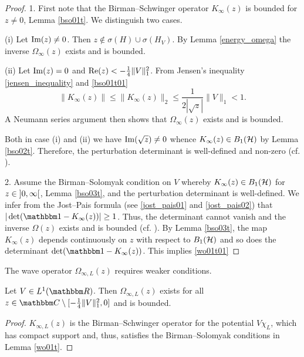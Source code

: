 \begin{proof}
1.
First note that the Birman--Schwinger operator $K_\infty(z)$ is bounded for $z\neq 0$, Lemma \ref{bso01t}.
We distinguish two cases.

(i)
Let $\operatorname{Im}(z)\neq 0$. Then $z\notin\sigma(H)\cup\sigma(H_V)$. 
By Lemma \ref{energy_omega} the inverse $\Omega_\infty(z)$ exists and is bounded.

(ii)
Let $\operatorname{Im}(z)=0$ and $\operatorname{Re}(z)<-\frac{1}{4}\|V\|_1^2$. From Jensen's inequality \eqref{jensen_inequality}
and \eqref{bso01t01}
\begin{equation*}
   \|K_\infty(z)\| \leq \|K_\infty(z)\|_2 \leq \frac{1}{2|\sqrt{z}|}\|V\|_1 < 1 .
\end{equation*}
A Neumann series argument then shows that $\Omega_\infty(z)$ exists and is bounded.

Both in case (i) and (ii) we have $\operatorname{Im}(\sqrt{z})\neq 0$ whence $K_\infty(z)\in B_1({\mathcal H})$ 
by Lemma \ref{bso02t}. Therefore, the perturbation determinant is well-defined and non-zero
(cf. \cite[Thm. XIII.105]{ReedSimon1978}). 

2.
Assume the Birman--Solomyak condition on $V$ whereby $K_\infty(z)\in B_1({\mathcal H})$ for $z\in\interval[open]{0}{\infty}$,
Lemma \ref{bso03t}, and the perturbation determinant is well-defined.
We infer from the Jost--Pais formula (see \eqref{jost_pais01} and \eqref{jost_pais02}) that $|\det(\id-K_\infty(z))| \geq 1$.
Thus, the determinant cannot vanish and the inverse $\Omega(z)$ exists and is bounded 
(cf. \cite[Thm. XIII.105, Thm. XIII.107]{ReedSimon1978}).
By Lemma \ref{bso03t}, the map $K_\infty(z)$ depends continuously on $z$ with respect to $B_1({\mathcal H})$ and so does
the determinant $\det(\id-K_\infty(z))$. This implies \eqref{wo01t01}
\end{proof}

The wave operator $\Omega_{\infty,L}(z)$ requires weaker conditions.

\begin{lemma}\label{wo01at}
Let $V\in L^1(\R)$. Then $\Omega_{\infty,L}(z)$ exists for all $z\in\C\setminus[-\frac{1}{4}\|V\|_1^2, 0]$ and is bounded.
\end{lemma}
\begin{proof}
$K_{\infty,L}(z)$ is the Birman--Schwinger operator for the potential $V\chi_L$, which has compact
support and, thus, satisfies the Birman--Solomyak conditions in Lemma \ref{wo01t}.
\end{proof}

